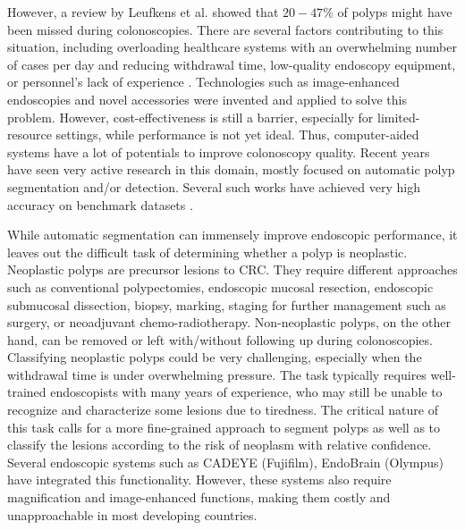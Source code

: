 \documentclass[runningheads]{llncs}
\begin{document}
	However, a review by Leufkens et al. \cite{leufkens2012factors} showed that $20-47\%$ of polyps might have been missed during colonoscopies. There are several factors contributing to this situation, including overloading healthcare systems with an overwhelming number of cases per day and reducing withdrawal time, low-quality endoscopy equipment, or personnel's lack of experience \cite{armin2015visibility,lee2008adequate}. Technologies such as image-enhanced endoscopies and novel accessories were invented and applied to solve this problem. However, cost-effectiveness is still a barrier, especially for limited-resource settings, while performance is not yet ideal. Thus, computer-aided systems have a lot of potentials to improve colonoscopy quality. Recent years have seen very active research in this domain, mostly focused on automatic polyp segmentation and/or detection. Several such works have achieved very high accuracy on benchmark datasets \cite{fan2020pranet,huang2021hardnet,tang2019cu}.

	While automatic segmentation can immensely improve endoscopic performance, it leaves out the difficult task of determining whether a polyp is neoplastic. Neoplastic polyps are precursor lesions to CRC. They require different approaches such as conventional polypectomies, endoscopic mucosal resection, endoscopic submucosal dissection, biopsy, marking, staging for further management such as surgery, or neoadjuvant chemo-radiotherapy. Non-neoplastic polyps, on the other hand, can be removed or left with/without following up during colonoscopies. Classifying neoplastic polyps could be very challenging, especially when the withdrawal time is under overwhelming pressure. The task typically requires well-trained endoscopists with many years of experience, who may still be unable to recognize and characterize some lesions due to tiredness. The critical nature of this task calls for a more fine-grained approach to segment polyps as well as to classify the lesions according to the risk of neoplasm with relative confidence. Several endoscopic systems such as CADEYE (Fujifilm), EndoBrain (Olympus) have integrated this functionality. However, these systems also require magnification and image-enhanced functions, making them costly and unapproachable in most developing countries.
\end{document}

